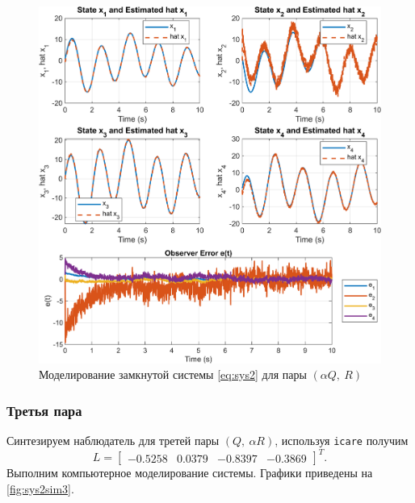 \begin{figure}[H]
    \centering
    \includegraphics[width=1\linewidth]{figs/2_sim2.png}
    \caption{Моделирование замкнутой системы \eqref{eq:sys2} для пары $(\alpha Q,\ R)$}
    \label{fig:sys2sim2}
\end{figure}

\newpage\subsubsection{Третья пара}

Синтезируем наблюдатель для третей пары $(Q,\ \alpha R)$, используя \texttt{icare} получим
\begin{equation*}
    L=\begin{bmatrix}
        -0.5258&
        0.0379&
       -0.8397&
       -0.3869
    \end{bmatrix}^T.
\end{equation*}
Выполним компьютерное моделирование системы. Графики приведены на \autoref{fig:sys2sim3}.

